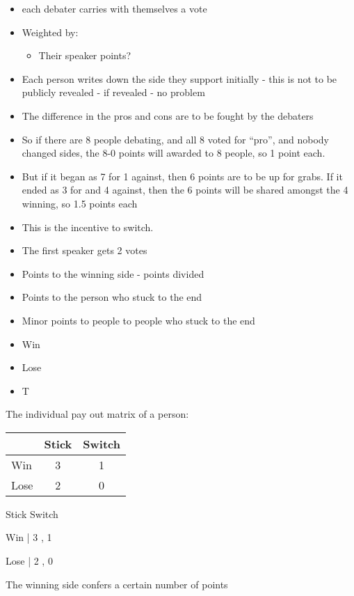 \documentclass[9pt]{article}
\begin{document}
\begin{itemize}
    \item each debater carries with themselves a vote
    \item Weighted by:
    \begin{itemize}
        \item Their speaker points?
    \end{itemize}
    \item Each person writes down the side they support initially - this is not to be publicly revealed - if revealed - no problem
    \item The difference in the pros and cons are to be fought by the debaters
    \item So if there are 8 people debating, and all 8 voted for ``pro'', and nobody changed sides, the 8-0 points will awarded to 8 people, so 1 point each.
    \item But if it began as 7 for 1 against, then 6 points are to be up for grabs. If it ended as 3 for and 4 against, then the 6 points will be shared amongst the 4 winning, so 1.5 points each
    \item This is the incentive to switch.
    \item The first speaker gets 2 votes
    \item Points to the winning side - points divided
    \item Points to the person who stuck to the end
    \item Minor points to people to people who stuck to the end
    \item Win
    \item Lose
    \item T
\end{itemize}

The individual pay out matrix of a person:

\begin{table}[h]
\centering
\begin{tabular}{l|cc}
\toprule
 & Stick & Switch \\
\midrule
Win & 3 & 1 \\
Lose & 2 & 0 \\
\bottomrule
\end{tabular}
\end{table}

Stick Switch

Win   | 3    , 1

Lose  |  2   , 0

The winning side confers a certain number of points
\end{document}
